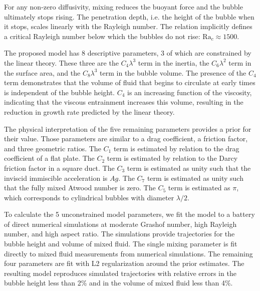 For any non-zero diffusivity, mixing reduces the buoyant force and the bubble ultimately stops rising.
The penetration depth, i.e. the height of the bubble when it stops, scales linearly with the Rayleigh number.
The relation implicitly defines a critical Rayleigh number below which the bubbles do not rise: $\text{Ra}_c \approx 1500$.

The proposed model has 8 descriptive parameters, 3 of which are constrained by the linear theory.
These three are the $C_4 \lambda^3$ term in the inertia, the $C_6 \lambda^2$ term in the surface area, and the $C_8 \lambda^3$ term in the bubble volume.
The presence of the $C_4$ term demonstrates that the volume of fluid that begins to circulate at early times is independent of the bubble height.
$C_4$ is an increasing function of the viscosity, indicating that the viscous entrainment increases this volume, resulting in the reduction in growth rate predicted by the linear theory.

The physical interpretation of the five remaining parameters provides a prior for their value.
Those parameters are similar to a drag coefficient, a friction factor, and three geometric ratios.
The $C_1$ term is estimated by relation to the drag coefficient of a flat plate.
The $C_2$ term is estimated by relation to the Darcy friction factor in a square duct.
The $C_3$ term is estimated as unity such that the inviscid immiscible acceleration is $Ag$.
The $C_7$ term is estimated as unity such that the fully mixed Atwood number is zero.
The $C_5$ term is estimated as $\pi$, which corresponds to cylindrical bubbles with diameter $\lambda / 2$.

To calculate the 5 unconstrained model parameters, we fit the model to a battery of direct numerical simulations at moderate Grashof number, high Rayleigh number, and high aspect ratio.
The simulations provide trajectories for the bubble height and volume of mixed fluid.
The single mixing parameter is fit directly to mixed fluid measurements from numerical simulations.
The remaining four parameters are fit with L2 regularization around the prior estimates.
The resulting model reproduces simulated trajectories with relative errors in the bubble height less than 2\% and in the volume of mixed fluid less than 4\%.

